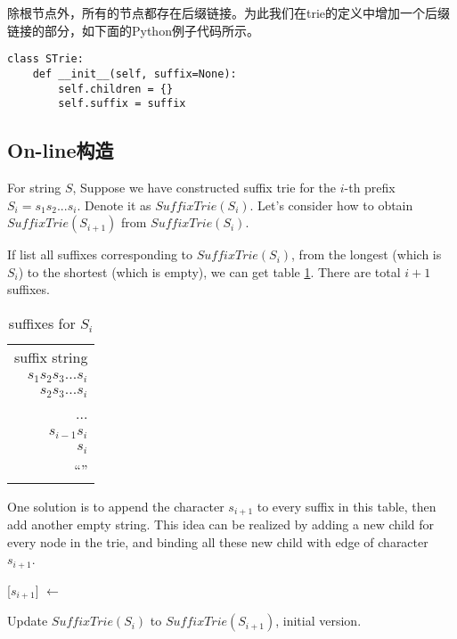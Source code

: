 \documentclass[UTF8]{article}
\begin{document}
除根节点外，所有的节点都存在后缀链接。为此我们在trie的定义中增加一个后缀链接的部分，如下面的Python例子代码所示。

\lstset{language=Python}
\begin{lstlisting}
class STrie:
    def __init__(self, suffix=None):
        self.children = {}
        self.suffix = suffix
\end{lstlisting}

\subsection{On-line构造}

For string $S$, Suppose we have constructed suffix trie for the $i$-th prefix
$S_i=s_1s_2...s_i$. Denote it as $SuffixTrie(S_i)$.
Let's consider how to obtain $SuffixTrie(S_{i+1})$ from $SuffixTrie(S_i)$.

If list all suffixes corresponding to $SuffixTrie(S_i)$, from the longest
(which is $S_i$) to the shortest (which is empty), we can get
table \ref{tab:suffixes_s_i}. There are total $i+1$ suffixes.

\begin{table}
  \begin{tabular}{r}
    suffix string \\
    $s_1s_2s_3...s_i$ \\
    $s_2s_3...s_i$ \\
    ... \\
    $s_{i-1}s_i$ \\
    $s_i$ \\
    ``'' \\
  \end{tabular}
  \caption{suffixes for $S_i$}
  \label{tab:suffixes_s_i}
\end{table}

One solution is to append the character $s_{i+1}$ to every suffix in this
table, then add another empty string. This idea can be realized by adding
a new child for every node in the trie, and binding all these new
child with edge of character $s_{i+1}$.

\begin{algorithm}
\begin{algorithmic}[1]
  \State {}[$s_{i+1}$] $\gets$ 
\EndFor
\end{algorithmic}
\caption{Update $SuffixTrie(S_i)$ to $SuffixTrie(S_{i+1})$, initial version.}
\label{algo:strie1}
\end{algorithm}
\end{document}
